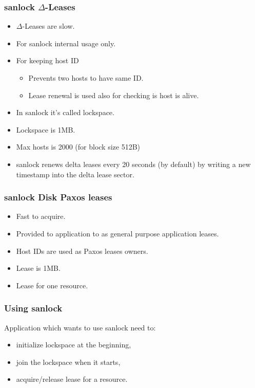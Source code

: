 \documentclass[10pt,utf8]{beamer}
\begin{document}
\begin{frame}
    \frametitle{sanlock $\Delta$-Leases}
    \begin{itemize}
     \item $\Delta$-Leases are slow.
     \item For sanlock internal usage only.
     \item For keeping host ID
     \begin{itemize}
        \item Prevents two hosts to have same ID.
        \item Lease renewal is used also for checking is host is alive.
     \end{itemize}
     \item In sanlock it's called lockspace.
     \item Lockspace is 1MB.
     \item Max hosts is 2000 (for block size 512B)
     \item sanlock renews delta leases every 20 seconds (by default) by writing a new timestamp into the delta lease sector.

    \end{itemize}
\end{frame}

\begin{frame}
    \frametitle{sanlock Disk Paxos leases}
    \begin{itemize}
     \item Fast to acquire.
     \item Provided to application to as general purpose application leases.
     \item Host IDs are used as Paxos leases owners.
     \item Lease is 1MB.
     \item Lease for one resource.
    \end{itemize}
\end{frame}

\begin{frame}
 \frametitle{Using sanlock}
 Application which wants to use sanlock need to:
 \begin{itemize}
  \item initialize lockspace at the beginning,
  \item join the lockspace when it starts,
  \item acquire/release lease for a resource.
 \end{itemize}
\end{frame}
\end{document}
